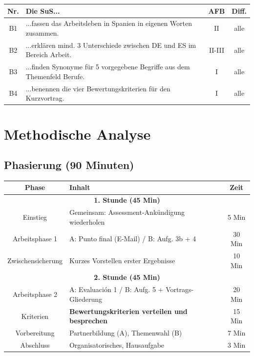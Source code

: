\documentclass[11pt, a4paper]{article}
\begin{document}
\begin{center}
\small
\begin{tabularx}{\textwidth}{|c|X|c|c|}
    \hline
    \textbf{Nr.} & \textbf{Die SuS...} & \textbf{AFB} & \textbf{Diff.} \\
    \hline
    B1 & ...fassen das Arbeitsleben in Spanien in eigenen Worten zusammen. & II & alle \\
    \hline
    B2 & ...erklären mind. 3 Unterschiede zwischen DE und ES im Bereich Arbeit. & II-III & alle \\
    \hline
    B3 & ...finden Synonyme für 5 vorgegebene Begriffe aus dem Themenfeld Berufe. & I & alle \\
    \hline
    B4 & ...benennen die vier Bewertungskriterien für den Kurzvortrag. & I & alle \\
    \hline
\end{tabularx}
\end{center}


\section{Methodische Analyse}

\subsection{Phasierung (90 Minuten)}

\begin{center}
\begin{tabular}{|c|l|c|}
    \hline
    \textbf{Phase} & \textbf{Inhalt} & \textbf{Zeit} \\
    \hline
    \multicolumn{3}{|c|}{\textbf{1. Stunde (45 Min)}} \\
    \hline
    Einstieg & Gemeinsam: Assessment-Ankündigung wiederholen & 5 Min \\
    \hline
    Arbeitsphase 1 & A: Punto final (E-Mail) / B: Aufg. 3b + 4 & 30 Min \\
    \hline
    Zwischensicherung & Kurzes Vorstellen erster Ergebnisse & 10 Min \\
    \hline
    \multicolumn{3}{|c|}{\textbf{2. Stunde (45 Min)}} \\
    \hline
    Arbeitsphase 2 & A: Evaluación 1 / B: Aufg. 5 + Vortrags-Gliederung & 20 Min \\
    \hline
    Kriterien & \textbf{Bewertungskriterien verteilen und besprechen} & 15 Min \\
    \hline
    Vorbereitung & Partnerbildung (A), Themenwahl (B) & 7 Min \\
    \hline
    Abschluss & Organisatorisches, Hausaufgabe & 3 Min \\
    \hline
\end{tabular}
\end{center}
\end{document}
